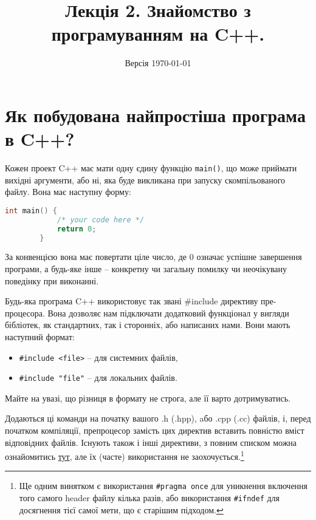 \documentclass[12pt]{article}
\title{Лекція 2. Знайомство з програмуванням на C++.}
\author{}
\date{Версія \today}
\begin{document}
	\maketitle
	
	\tableofcontents
	
	\section{Як побудована найпростіша програма в C++?}
	Кожен проект C++ має мати одну єдину функцію \texttt{main()}, що може приймати вихідні аргументи, або ні, яка буде викликана при запуску скомпільованого файлу. Вона має наступну форму:
	\begin{lstlisting}[language=c++]
		int main() {
			/* your code here */
			return 0; 
		}
	\end{lstlisting}

	За конвенцією вона має повертати ціле число, де 0 означає успішне завершення програми, а будь-яке інше -- конкретну чи загальну помилку чи неочікувану поведінку при виконанні.

	Будь-яка програма C++ використовує так звані \#include директиву пре-процесора. Вона дозволяє нам підключати додатковий функціонал у вигляди бібліотек, як стандартних, так і сторонніх, або написаних нами. Вони мають наступний формат:
	\begin{itemize}
		\item \texttt{\#include <file>} -- для системних файлів,
		\item \texttt{\#include "file"} -- для локальних файлів.
	\end{itemize}
	Майте на увазі, що різниця в формату не строга, але її варто дотримуватись.

	Додаються ці команди на початку вашого .h (.hpp), aбо .cpp (.cc) файлів, і, перед початком компіляції, препроцесор замість цих директив вставить повністю вміст відповідних файлів. Існують також і інші директиви, з повним списком можна ознайомитись \href{https://en.cppreference.com/w/cpp/preprocessor}{тут}, але їх (часте) використання не заохочується.\footnote{Ще одним винятком є використання \texttt{\#pragma once} для уникнення включення того самого header файлу кілька разів, або використання \texttt{\#ifndef} для досягнення тієї самої мети, що є старішим підходом.}
\end{document}
